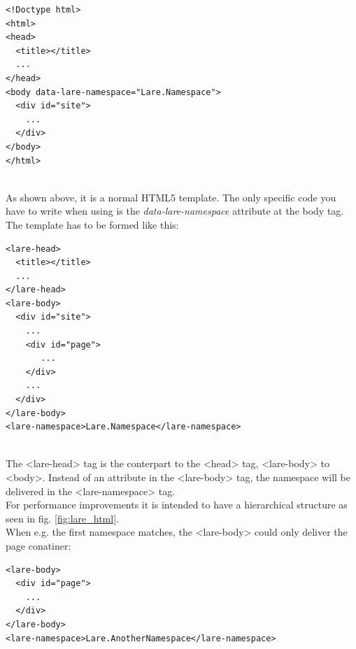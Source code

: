 \begin{minipage}[c]{0.95\linewidth}
\begin{lstlisting}[caption=Example Lare Base Template, label=example_lare_base_template]
<!Doctype html>
<html>
<head>
  <title></title>
  ...
</head>
<body data-lare-namespace="Lare.Namespace">
  <div id="site">
    ...
  </div>
</body>
</html>
\end{lstlisting}
\end{minipage}
\\
As shown above, it is a normal HTML5 template.
The only specific code you have to write when using \lare{} is the \emph{data-lare-namespace} attribute at the body tag.
\\
The \lare{} template has to be formed like this:

\begin{minipage}[c]{0.95\linewidth}
\begin{lstlisting}[caption=Example Lare Template, label=example_lare_template]
<lare-head>
  <title></title>
  ...
</lare-head>
<lare-body>
  <div id="site">
    ...
    <div id="page">
       ...
    </div>
    ...
  </div>
</lare-body>
<lare-namespace>Lare.Namespace</lare-namespace>
\end{lstlisting}
\end{minipage}
\\
The <lare-head> tag is the conterpart to the <head> tag, <lare-body> to <body>.
Instead of an attribute in the <lare-body> tag, the namespace will be delivered in the <lare-namespace> tag.
\\
For performance improvements it is intended to have a hierarchical structure as seen in fig. \ref{fig:lare_html}.
\\
When e.g. the first namespace matches, the <lare-body> could only deliver the page conatiner:

\begin{minipage}[c]{0.95\linewidth}
\begin{lstlisting}[caption=Example Lare Response, label=example_lare_response]
<lare-body>
  <div id="page">
    ...
  </div>
</lare-body>
<lare-namespace>Lare.AnotherNamespace</lare-namespace>
\end{lstlisting}
\end{minipage}



